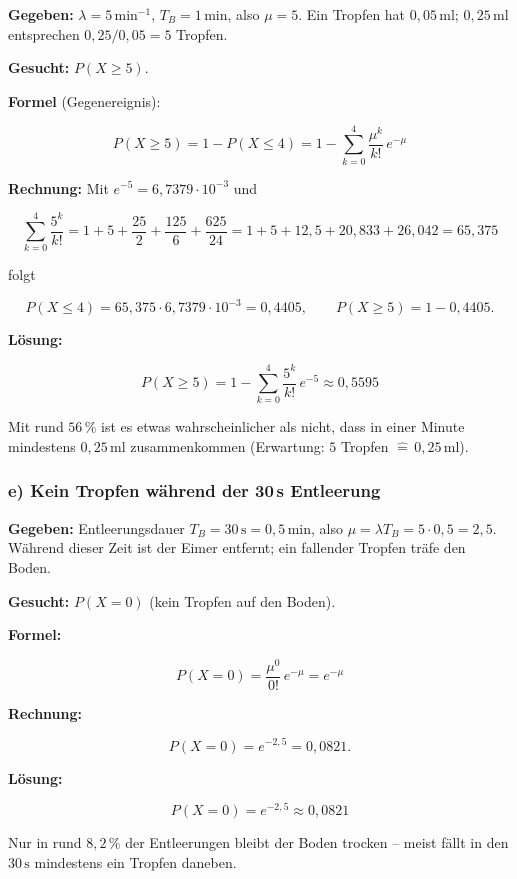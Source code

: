 \begin{beispiel}

\textbf{Gegeben:} $\lambda = 5\,\mathrm{min}^{-1}$, $T_B = 1\,\mathrm{min}$,
also $\mu = 5$. Ein Tropfen hat $0{,}05\,\mathrm{ml}$; $0{,}25\,\mathrm{ml}$
entsprechen $0{,}25/0{,}05 = 5$ Tropfen.

\textbf{Gesucht:} $P(X \geq 5)$.

\textbf{Formel} (Gegenereignis):

$$
P(X \geq 5) = 1 - P(X \leq 4) = 1 - \sum_{k=0}^{4} \frac{\mu^k}{k!}\, e^{-\mu}
$$

\textbf{Rechnung:} Mit $e^{-5} = 6{,}7379 \cdot 10^{-3}$ und

$$
\sum_{k=0}^{4} \frac{5^k}{k!} = 1 + 5 + \frac{25}{2} + \frac{125}{6} + \frac{625}{24}
= 1 + 5 + 12{,}5 + 20{,}833 + 26{,}042 = 65{,}375
$$

folgt

$$
P(X \leq 4) = 65{,}375 \cdot 6{,}7379 \cdot 10^{-3} = 0{,}4405,
\qquad P(X \geq 5) = 1 - 0{,}4405.
$$

\textbf{Lösung:}

$$
\boxed{\;P(X \geq 5) = 1 - \sum_{k=0}^{4} \frac{5^k}{k!}\, e^{-5} \approx 0{,}5595\;}
$$

Mit rund $56\,\%$ ist es etwas wahrscheinlicher als nicht, dass in einer Minute
mindestens $0{,}25\,\mathrm{ml}$ zusammenkommen (Erwartung: $5$ Tropfen
$\hat{=}\, 0{,}25\,\mathrm{ml}$).

\end{beispiel}

\subsubsection*{e) Kein Tropfen während der 30\,s Entleerung}

\begin{beispiel}

\textbf{Gegeben:} Entleerungsdauer $T_B = 30\,\mathrm{s} = 0{,}5\,\mathrm{min}$,
also $\mu = \lambda T_B = 5 \cdot 0{,}5 = 2{,}5$. Während dieser Zeit ist der
Eimer entfernt; ein fallender Tropfen träfe den Boden.

\textbf{Gesucht:} $P(X = 0)$ (kein Tropfen auf den Boden).

\textbf{Formel:}

$$
P(X = 0) = \frac{\mu^0}{0!}\, e^{-\mu} = e^{-\mu}
$$

\textbf{Rechnung:}

$$
P(X = 0) = e^{-2{,}5} = 0{,}0821.
$$

\textbf{Lösung:}

$$
\boxed{\;P(X = 0) = e^{-2{,}5} \approx 0{,}0821\;}
$$

Nur in rund $8{,}2\,\%$ der Entleerungen bleibt der Boden trocken -- meist fällt
in den $30\,\mathrm{s}$ mindestens ein Tropfen daneben.

\end{beispiel}


